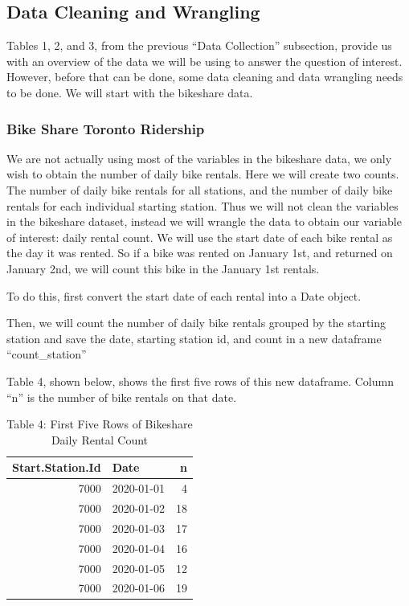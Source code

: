 \documentclass[
]{article}
\begin{document}
\hypertarget{data-cleaning-and-wrangling}{%
\subsection{Data Cleaning and
Wrangling}\label{data-cleaning-and-wrangling}}

Tables 1, 2, and 3, from the previous ``Data Collection'' subsection,
provide us with an overview of the data we will be using to answer the
question of interest. However, before that can be done, some data
cleaning and data wrangling needs to be done. We will start with the
bikeshare data.

\hypertarget{bike-share-toronto-ridership-1}{%
\subsubsection{Bike Share Toronto
Ridership}\label{bike-share-toronto-ridership-1}}

We are not actually using most of the variables in the bikeshare data,
we only wish to obtain the number of daily bike rentals. Here we will
create two counts. The number of daily bike rentals for all stations,
and the number of daily bike rentals for each individual starting
station. Thus we will not clean the variables in the bikeshare dataset,
instead we will wrangle the data to obtain our variable of interest:
daily rental count. We will use the start date of each bike rental as
the day it was rented. So if a bike was rented on January 1st, and
returned on January 2nd, we will count this bike in the January 1st
rentals.

To do this, first convert the start date of each rental into a Date
object.

Then, we will count the number of daily bike rentals grouped by the
starting station and save the date, starting station id, and count in a
new dataframe ``count\_station''

Table 4, shown below, shows the first five rows of this new dataframe.
Column ``n'' is the number of bike rentals on that date.

\begin{table}[!h]

\caption{\label{tab:Table 4 First Five Rows of Bikeshare Daily Rental Count}Table 4: First Five Rows of Bikeshare Daily Rental Count}
\centering
\begin{tabular}[t]{r|l|r}
\hline
Start.Station.Id & Date & n\\
\hline
7000 & 2020-01-01 & 4\\
\hline
7000 & 2020-01-02 & 18\\
\hline
7000 & 2020-01-03 & 17\\
\hline
7000 & 2020-01-04 & 16\\
\hline
7000 & 2020-01-05 & 12\\
\hline
7000 & 2020-01-06 & 19\\
\hline
\end{tabular}
\end{table}
\end{document}
